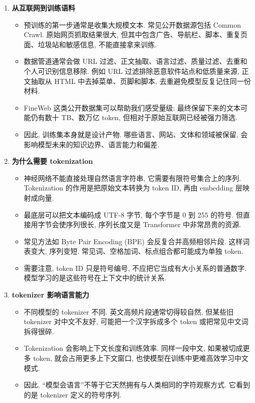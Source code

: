 \documentclass{../nndlcourse}
\begin{document}
\begin{enumerate}
  \item \textbf{从互联网到训练语料}
    \begin{itemize}
      \item 预训练的第一步通常是收集大规模文本. 常见公开数据源包括 Common Crawl. 原始网页抓取结果很大, 但其中包含广告、导航栏、脚本、重复页面、垃圾站和敏感信息, 不能直接拿来训练.
      \item 数据管道通常会做 URL 过滤、正文抽取、语言过滤、质量过滤、去重和个人可识别信息移除. 例如 URL 过滤排除恶意软件站点和低质量来源, 正文抽取从 HTML 中去掉菜单、页脚和脚本, 去重避免模型反复记住同一份材料.
      \item FineWeb 这类公开数据集可以帮助我们感受量级: 最终保留下来的文本可能仍有数十 TB、数万亿 token, 但相对于原始互联网已经被强力筛选.
      \item 因此, 训练集本身就是设计产物. 哪些语言、网站、文体和领域被保留, 会影响模型未来的知识边界、语言能力和偏差.
    \end{itemize}
  \item \textbf{为什么需要 tokenization}
    \begin{itemize}
      \item 神经网络不能直接处理自然语言字符串, 它需要有限符号集合上的序列. Tokenization 的作用是把原始文本转换为 token ID, 再由 embedding 层映射成向量.
      \item 最底层可以把文本编码成 UTF-8 字节, 每个字节是 0 到 255 的符号. 但直接用字节会使序列很长, 序列长度又是 Transformer 中非常昂贵的资源.
      \item 常见方法如 Byte Pair Encoding (BPE) 会反复合并高频相邻片段. 这样词表变大, 序列变短. 常见词、空格加词、标点组合都可能成为单独 token.
      \item 需要注意, token ID 只是符号编号, 不应把它当成有大小关系的普通数字. 模型学习的是这些符号在上下文中的统计关系.
    \end{itemize}
  \item \textbf{tokenizer 影响语言能力}
    \begin{itemize}
      \item 不同模型的 tokenizer 不同. 英文高频片段通常切得较自然, 但某些旧 tokenizer 对中文不友好, 可能把一个汉字拆成多个 token 或把常见中文词拆得很碎.
      \item Tokenization 会影响上下文长度和训练效率. 同样一段中文, 如果被切成更多 token, 就会占用更多上下文窗口, 也使模型在训练中更难高效学习中文模式.
      \item 因此, “模型会语言”不等于它天然拥有与人类相同的字符观察方式. 它看到的是 tokenizer 定义的符号序列.

\end{itemize}
\end{enumerate}
\end{document}
